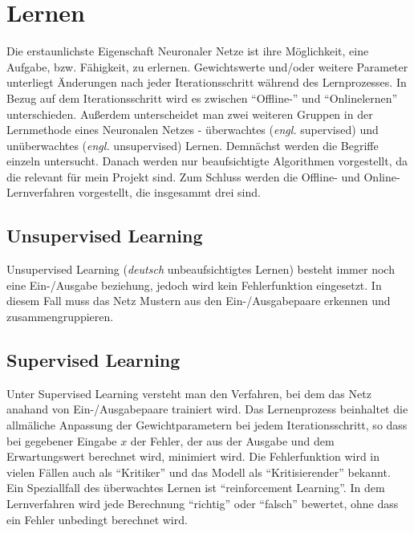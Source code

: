 \section{Lernen} %
Die erstaunlichste Eigenschaft Neuronaler Netze ist ihre Möglichkeit, eine Aufgabe, bzw. Fähigkeit, zu erlernen. Gewichtswerte und/oder weitere Parameter unterliegt Änderungen nach jeder Iterationsschritt während des Lernprozesses. In Bezug auf dem Iterationsschritt wird es zwischen ``Offline-'' und ``Onlinelernen'' unterschieden. Außerdem unterscheidet man zwei weiteren Gruppen in der Lernmethode eines Neuronalen Netzes - überwachtes (\textit{engl.} supervised) und unüberwachtes (\textit{engl.} unsupervised) Lernen. Demnächst werden die Begriffe einzeln untersucht. Danach werden nur beaufsichtigte Algorithmen vorgestellt, da die relevant für mein Projekt sind. Zum Schluss werden die Offline- und Online-Lernverfahren vorgestellt, die insgesammt drei sind.  \cite{SCTemassi:01} \cite{CIKruse:15} \cite{NFSC:97} %

\subsection{Unsupervised Learning}
Unsupervised Learning (\textit{deutsch} unbeaufsichtigtes Lernen) besteht immer noch eine Ein-/Ausgabe beziehung, jedoch wird kein Fehlerfunktion eingesetzt. In diesem Fall muss das Netz Mustern aus den Ein-/Ausgabepaare erkennen und zusammengruppieren.

\subsection{Supervised Learning}

Unter Supervised Learning versteht man den Verfahren, bei dem das Netz anahand von Ein-/Ausgabepaare trainiert wird. Das Lernenprozess beinhaltet die allmäliche Anpassung der Gewichtparametern bei jedem Iterationsschritt, so dass bei gegebener Eingabe $x$ der Fehler, der aus der Ausgabe und dem Erwartungswert berechnet wird, minimiert wird. Die Fehlerfunktion wird in vielen Fällen auch als ``Kritiker'' und das Modell als ``Kritisierender'' bekannt. Ein Speziallfall des überwachtes Lernen ist ``reinforcement Learning''. In dem Lernverfahren wird jede Berechnung ``richtig'' oder ``falsch'' bewertet, ohne dass ein Fehler unbedingt berechnet wird. \cite{SCTemassi:01} \cite{CIKruse:15} \cite{NFSC:97}

